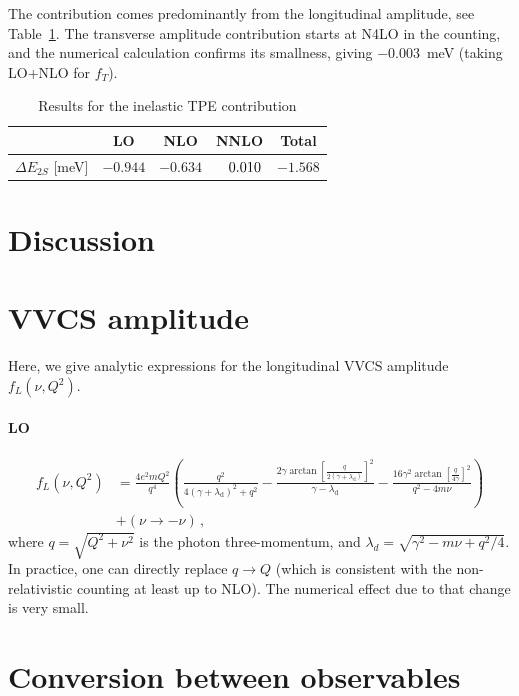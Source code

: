 \documentclass[prl,
twocolumn,
showpacs,preprintnumbers,amsmath,amssymb,
superscriptaddress,
a4paper,nofootinbib,longbibliography]{revtex4-2}
\def\hpm{\hphantom{-}}
\begin{document}
The contribution comes predominantly from the longitudinal amplitude, see Table~\ref{tab:resultsorders}. The transverse amplitude contribution starts at N4LO in the counting, and the numerical calculation confirms its smallness, giving $-0.003$~meV (taking LO+NLO for $f_T$).

\begin{table}[hbt]
\label{tab:resultsorders}
\begin{tabular}{c||c c c || c}
                         & LO       & NLO       & NNLO     & Total\\
\hline
\hline
$\Delta E_{2S}$ [meV]    & $-0.944$ & $-0.634$  & $\hpm 0.010$  & $-1.568$    
\end{tabular}
\caption{Results for the inelastic TPE contribution}
\end{table}

\section{Discussion}

\newpage
\appendix
\section{VVCS amplitude}
Here, we give analytic expressions for the longitudinal VVCS amplitude $f_L(\nu,Q^2)$.
\paragraph{LO}

\begin{align}
 f_L(\nu,Q^2)& = \frac{4 e^2 m Q^2}{q^4} \left(\frac{q^2}{4 (\gamma +\lambda_\mathrm{d})^2+q^2}-\frac{2 \gamma  \arctan\left[\frac{q}{2 (\gamma +\lambda_\mathrm{d})}\right]^2}{\gamma -\lambda_\mathrm{d}}-\frac{16 \gamma ^2 \arctan\left[\frac{q}{4 \gamma }\right]^2}{q^2-4 m \nu }\right)\nonumber\\
   & + (\nu\to-\nu)\,,
\end{align}
where $q=\sqrt{Q^2+\nu^2}$ is the photon three-momentum, and $\lambda_d=\sqrt{\gamma^2-m\nu+q^2/4}$. In practice, one can directly replace $q\to Q$ (which is consistent with the non-relativistic counting at least up to NLO). The numerical effect due to that change is very small.

\section{Conversion between observables}
\end{document}
